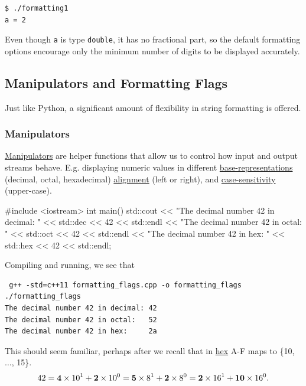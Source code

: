 \documentclass[12pt,letterpaper,twoside]{article}
\begin{document}
{\small
\begin{verbatim}
$ ./formatting1
a = 2
\end{verbatim}
}

Even though \texttt{a} is type \texttt{double}, it has no fractional part, so the 
default formatting options encourage only the minimum number of digits to be 
displayed accurately.


\subsection{Manipulators and Formatting Flags}
Just like Python, a significant amount of flexibility in string formatting is offered.

\vspace{-2ex}
\subsubsection{Manipulators} 
\href{https://en.cppreference.com/w/cpp/io/manip}{Manipulators}
are helper functions that allow us to control 
how input and output streams behave. E.g. displaying numeric values in 
different \href{https://en.cppreference.com/w/cpp/io/manip/hex}{base-representations} 
(decimal, octal, hexadecimal) 
\href{https://en.cppreference.com/w/cpp/io/manip/left}{alignment} 
(left or right), and
\href{https://en.cppreference.com/w/cpp/io/manip/uppercase}{case-sensitivity} (upper-case).

\begin{cpp}
#include <iostream>
int main() {
    std::cout << "The decimal number 42 in decimal: " << std::dec << 42 << std::endl
              << "The decimal number 42 in octal:   " << std::oct << 42 << std::endl
              << "The decimal number 42 in hex:     " << std::hex << 42 << std::endl;
} \end{cpp}

Compiling and running, we see that

{\small
\begin{verbatim} g++ -std=c++11 formatting_flags.cpp -o formatting_flags
./formatting_flags
The decimal number 42 in decimal: 42 
The decimal number 42 in octal:   52 
The decimal number 42 in hex:     2a 
\end{verbatim}
}

This should seem familiar, perhaps after we recall that in 
\href{https://simple.wikipedia.org/wiki/Hexadecimal_numeral_system}{hex} 
A-F maps to {\small \{10, $\ldots$, 15\}}.
\[
  42 = {\bf 4} \times 10^1 + {\bf 2}\times 10^0 = {\bf 5}\times 8^1  + {\bf 2}\times 8^0 = {\bf 2}\times 16^1 + {\bf 10}\times 16^0.
\]
\end{document}
